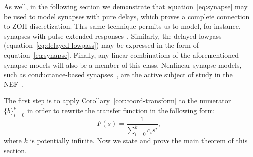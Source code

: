 As well, in the following section we demonstrate that equation~\ref{eq:synapse} may be used to model synapses with pure delays, which proves a complete connection to ZOH discretization.
This same technique permits us to model, for instance, synapses with pulse-extended responses~\citep{voelker2017iscas}.
Similarly, the delayed lowpass (equation~\ref{eq:delayed-lowpass}) may be expressed in the form of equation~\ref{eq:synapse}.
Finally, any linear combinations of the aforementioned synapse models will also be a member of this class.
Nonlinear synapse models, such as conductance-based synapses~\citep[e.g.,][equation~6]{destexhe1994efficient}, are the active subject of study in the NEF~\citep{stockel2017, stoeckel2018}.


The first step is to apply Corollary~\ref{cor:coord-transform} to the numerator $\{b\}_{i=0}^p$ in order to rewrite the transfer function in the following form:
\begin{equation} \label{eq:synapse-rewritten}
F(s) = \frac{1}{\sum_{i=0}^k c_i s^i} \text{,}
\end{equation}
where $k$ is potentially infinite. Now we state and prove the main theorem of this section.

